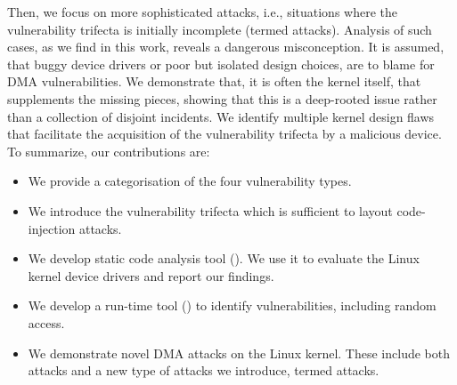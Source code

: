 Then, we focus on more sophisticated attacks, i.e., situations where the vulnerability trifecta is initially incomplete (termed \compound attacks).
Analysis of such cases, as we find in this work, reveals a dangerous misconception. It is assumed, that buggy device drivers or poor but isolated design choices, are to blame for DMA vulnerabilities. 
We demonstrate that, it is often the kernel itself, that supplements the missing pieces, showing that this is a deep-rooted issue rather than a collection of disjoint incidents.
We identify multiple kernel design flaws that facilitate the acquisition of the vulnerability trifecta by a malicious device.
%
%
To summarize, our contributions are:
\begin{itemize}
    \item We provide a categorisation of the four \subpage{} vulnerability types.
    \item We introduce the vulnerability trifecta which is sufficient to layout code-injection attacks.
    \item We develop static code analysis tool (\tool). We use it to evaluate the Linux kernel device drivers and report our findings.
    \item We develop a run-time tool (\dkasan) to identify \subpage{} vulnerabilities, including random access.
    \item We demonstrate novel DMA attacks on the Linux kernel. These include both \simple{} attacks and a new type of attacks we introduce, termed \compound{} attacks.
\end{itemize}





